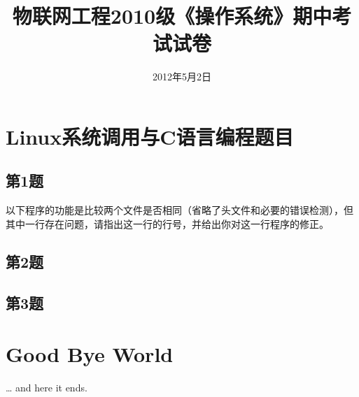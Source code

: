 \documentclass[a4paper,11pt]{article}
\title{物联网工程2010级《操作系统》期中考试试卷}
\date{2012年5月2日}
\begin{document}
\begin{CJK*}{UTF8}{gbsn}

\maketitle

\section{Linux系统调用与C语言编程题目}

\subsection{第1题}
以下程序的功能是比较两个文件是否相同（省略了头文件和必要的错误检测），但其中一行存在问题，请指出这一行的行号，并给出你对这一行程序的修正。
\lstset{language=C, frame=trbl}


\subsection{第2题}
\subsection{第3题}

\section{Good Bye World}
\ldots{} and here it ends.


\end{CJK*}
\end{document}
